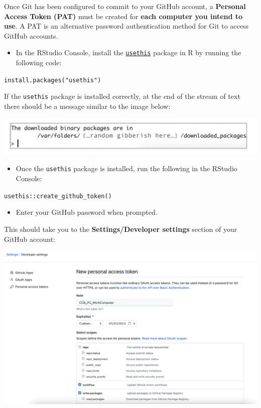 \documentclass[
]{book}
\providecommand{\tightlist}{%
  \setlength{\itemsep}{0pt}\setlength{\parskip}{0pt}}
\begin{document}
Once Git has been configured to commit to your GitHub account, a \textbf{Personal Access Token (PAT)} must be created for \textbf{each computer you intend to use}. A PAT is an alternative password authentication method for Git to access GitHub accounts.

\begin{itemize}
\tightlist
\item
  In the RStudio Console, install the \href{https://usethis.r-lib.org/}{\texttt{usethis}} package in R by running the following code:
\end{itemize}

\texttt{install.packages("usethis")}

If the \texttt{usethis} package is installed correctly, at the end of the stream of text there should be a message similar to the image below:

\begin{flushleft}\includegraphics[width=0.8\linewidth]{images/usethis} \end{flushleft}

\begin{itemize}
\tightlist
\item
  Once the \texttt{usethis} package is installed, run the following in the RStudio Console:
\end{itemize}

\texttt{usethis::create\_github\_token()}

\begin{itemize}
\tightlist
\item
  Enter your GitHub password when prompted.
\end{itemize}

This should take you to the \textbf{Settings/Developer settings} section of your GitHub account:

\begin{flushleft}\includegraphics[width=0.8\linewidth]{images/pat} \end{flushleft}
\end{document}

